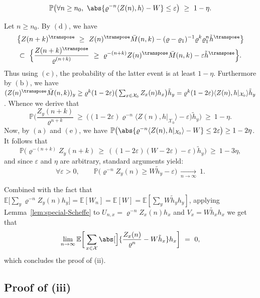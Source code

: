 \begin{refsegment}
\begin{enumerate}[(a)]
    \[
    \mathbb{P}\big(\forall n \geq n_0,\ \abs{\varrho^{-n}\langle Z(n), h\rangle-W}\leq \varepsilon\big)\ \geq\ 1-\eta.
    \]
\end{enumerate}
Let $n\geq n_0$. By $(\mathrm{d})$, we have
\begin{multline*}
\big\{ Z(n+k)^\transpose \ \geq\ Z(n)^\transpose\bar{M}(n,k)-(\varrho-\varrho_1)^{-1}\varrho^k\varrho_1^n\tilde{h}^\transpose\big\} \\\subset\ \Big\{ \frac{Z(n+k)^\transpose}{\varrho^{(n+k)}}\ \geq\ \varrho^{-(n+k)}Z(n)^\transpose\bar{M}(n,k)-\varepsilon \tilde{h}^\transpose \Big\}.
\end{multline*}
Thus using $(\mathrm{c})$, the probability of the latter event is at least $1-\eta$.
Furthermore by $(\mathrm{b})$, we have $(Z(n)^\transpose \bar{M}(n,k))_y \geq \varrho^k (1-2\varepsilon)\big(\sum_{x\in \mathcal{X}_0} Z_x(n)h_x\big)\tilde{h}_y = \varrho^k (1-2\varepsilon)\langle Z(n),h|_{\mathcal{X}_0}\rangle  \tilde{h}_y$.
%
Whence we derive that
%
\begin{equation*}
    \mathbb{P}\Big( \frac{Z_y(n+k)}{\varrho^{n+k}}\ \geq\ \big( (1-2\varepsilon)\varrho^{-n}\langle Z(n),h|_{\mathcal{X}_0}\rangle-\varepsilon\big) \tilde{h}_y \Big)\ \geq\ 1-\eta.
\end{equation*} 
Now, by $(\mathrm{a})$ and $(\mathrm{e})$, we have $\mathbb{P}\big(\abs{\varrho^{-n}\langle Z(n),h|_{\mathcal{X}_0}\rangle-W}\leq 2\varepsilon \big)\geq 1- 2\eta$.
It follows that
\[
  \mathbb{P}\big( \varrho^{-(n+k)}Z_y(n+k)\ \geq\ ( (1-2\varepsilon)(W-2\varepsilon)-\varepsilon) \tilde{h}_y \big)\ \geq\ 1-3\eta,
\]
and since $\varepsilon$ and $\eta$ are arbitrary, standard arguments yield:
\begin{equation*}
   \forall \varepsilon > 0, \qquad \mathbb{P}\big(\varrho^{-n}Z_y(n)\geq W\tilde{h}_y - \varepsilon\big)\ \underset{n\to\infty}{\longrightarrow}\ 1.
\end{equation*}
%

Combined with the fact that $\mathbb{E}\big[\sum_{y}\varrho^{-n}Z_y(n)h_y\big] = \mathbb{E}[W_n]=\mathbb{E}[W] = \mathbb{E}[\sum_{y}W\tilde{h}_yh_y]$, applying Lemma~\ref{lem:special-Scheffe} to $U_{n,x}=\varrho^{-n}Z_x(n)h_x$ and $V_x=W\tilde{h}_xh_x$ we get that
\[
 \lim_{n\to\infty} \mathbb{E}\bigg[\sum_{x\in\mathcal{X}}\abs[\Big]{\frac{Z_x(n)}{\varrho^n} - W\tilde{h}_x}h_x \bigg] \ =\ 0,
\]
which concludes the proof of (ii).


\subsection{Proof of (iii)}

\end{refsegment}

